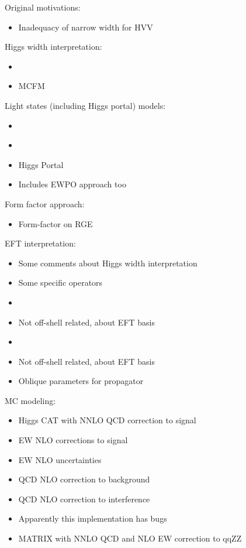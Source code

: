 \documentclass[11pt,letterpaper]{article}
\begin{document}
Original motivations:
\begin{itemize}
  \item \cite{Kauer:2012hd} Inadequacy of narrow width for HVV
\end{itemize}

Higgs width interpretation:
\begin{itemize}  
  \item \cite{Caola:2013yja}
  \item \cite{Campbell:2013una} MCFM
\end{itemize}

Light states (including Higgs portal) models:
\begin{itemize}
  \item \cite{Englert:2014aca}
  \item \cite{Englert:2014ffa}
  \item \cite{Goncalves:2017iub} Higgs Portal
  \item \cite{Englert:2020gcp} Includes EWPO approach too
\end{itemize}

Form factor approach:
\begin{itemize}
  \item \cite{Goncalves:2018pkt} Form-factor on RGE
\end{itemize}

EFT interpretation:
\begin{itemize}
  \item \cite{Azatov:2014jga} Some comments about Higgs width interpretation
  \item \cite{Gainer:2014hha} Some specific operators
  \item \cite{Azatov:2016xik}
  \item \cite{Falkowski:2015wzab} Not off-shell related, about EFT basis
  \item \cite{Contino:2016jqw}
  \item \cite{Falkowski:2001958} Not off-shell related, about EFT basis
  \item \cite{Englert:2019zmt} Oblique parameters for propagator
\end{itemize}

MC modeling:
\begin{itemize}
  \item \cite{Passarino:2013bha} Higgs CAT with NNLO QCD correction to signal
  \item \cite{Biedermann:2016yvs} EW NLO corrections to signal
  \item \cite{Gieseke:2014gka} EW NLO uncertainties
  \item \cite{Caola:2015psa} QCD NLO correction to background
  \item \cite{Caola:2016trd} QCD NLO correction to interference
  \item \cite{Alioli:2016xab} Apparently this implementation has bugs
  \item \cite{Kallweit:2019zez} MATRIX with NNLO QCD and NLO EW correction to qqZZ
\end{itemize}
\end{document}
